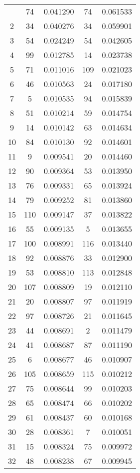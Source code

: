 \documentclass{article}
\begin{document}
\begin{center}
\begin{longtable}{|c|c|c|c|r|}
\hline 
\endlastfoot
1 & \color{red}74 & 0.041290 & \color{red}74  & 0.061533  \\ 
2 & \color{red}34 & 0.040276 & \color{red}34  & 0.059901  \\
3 & \color{red}54 & 0.024249  & \color{red}54  & 0.042605 \\ 
4 & 99 & 0.012785  & 14  & 0.023738 \\
5 & 71  &0.011016 & 109  & 0.021023 \\
6 & 46  &0.010563 & 24  & 0.017180 \\
7 & 5  &0.010535 & 94  & 0.015839  \\
8 & 51  &0.010214 & 59  & 0.014754  \\
9 & 14  &0.010142  & 63  & 0.014634  \\
10 & 84  &0.010130 & 92  & 0.014601  \\
11 & 9  &0.009541 & 20  & 0.014460  \\
12 & 90  &0.009364 & 53  & 0.013950  \\
13 & 76  &0.009331 & 65  & 0.013924  \\
14 & 79  &0.009252 & 81  & 0.013860  \\
15 & 110  &0.009147 & 37  & 0.013822  \\
16 & 55  &0.009135 & 5  & 0.013655  \\
17 & 100  &0.008991 & 116  & 0.013440 \\
18 & 92  &0.008876 & 33  & 0.012900  \\
19 & 53  &0.008810 & 113  & 0.012848  \\
20 & 107  &0.008809 & 19  & 0.012110 \\ 
21 & 20  &0.008807 & 97  & 0.011919 \\ 
22 & 97  &0.008726 & 21  & 0.011645 \\ 
23 & 44  &0.008691 & 2  & 0.011479 \\ 
24 & 41  &0.008687 & 87  & 0.011190 \\ 
25 & 6  &0.008677 & 46  & 0.010907 \\ 
26 & 105  &0.008659  & 115  & 0.010212 \\ 
27 & 75  &0.008644 & 99  & 0.010203 \\
28 & 65  &0.008474 & 66  & 0.010202 \\ 
29 & 61  &0.008437 & 60  & 0.010168 \\ 
30 & 28  &0.008361 & 7  & 0.010051 \\ 
31 & 15  &0.008324 & 75  & 0.009972 \\ 
32 & 48  &0.008238 & 67  & 0.009945 \\ 

\end{longtable}
\end{center}
\end{document}

